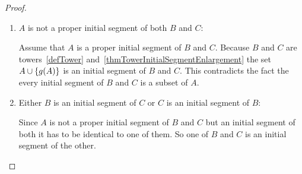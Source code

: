 \begin{lemma}
\begin{proof}
\begin{enumerate}
                Assume $y \in \set{x}^l \cap B$ i.e. $y \le x$ and $y \in B$.
                This implies $y \in I$ because $I$ is an initial segment of $B$
                by definition of an initial segment~\ref{defInitialSegment}.
                Since $I$ is an initial segment of $C$ as well by definition of
                an initial segment we have $y \in C$. Therefore $y \in \set{x}^l
                \cap C$.

            \item $A$ is not a proper initial segment of both $B$ and $C$:

                Assume that $A$ is a proper initial segment of $B$ and $C$.
                Because $B$ and $C$ are towers~\ref{defTower}
                and~\ref{thmTowerInitialSegmentEnlargement} the set $A \cup
                \left\{g(A)\right\}$ is an initial segment of $B$ and $C$. This
                contradicts the fact the every initial segment of $B$ and $C$ is
                a subset of $A$.

            \item Either $B$ is an initial segment of $C$ or $C$ is an initial
                segment of $B$:

                Since $A$ is not a proper initial segment of $B$ and $C$ but an
                initial segment of both it has to be identical to one of them.
                So one of $B$ and $C$ is an initial segment of the other.
        \end{enumerate}
    \end{proof}
\end{lemma}



